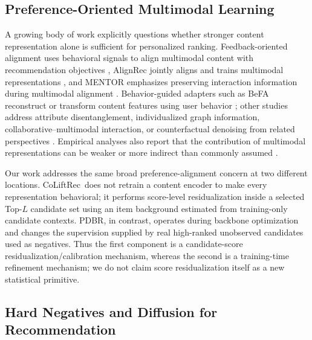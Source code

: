 \documentclass[sigconf,anonymous,review]{acmart}
\newcommand{\methodname}{CoLiftRec}
\newcommand{\pdbr}{PDBR}
\begin{document}
\subsection{Preference-Oriented Multimodal Learning}

A growing body of work explicitly questions whether stronger content representation alone is sufficient for personalized ranking.
Feedback-oriented alignment uses behavioral signals to align multimodal content with recommendation objectives \cite{xv2024damrs,li2024whotoalign}, AlignRec jointly aligns and trains multimodal representations \cite{liu2024alignrec}, and MENTOR emphasizes preserving interaction information during multimodal alignment \cite{xu2025mentor}.
Behavior-guided adapters such as BeFA reconstruct or transform content features using user behavior \cite{fan2025befa}; other studies address attribute disentanglement, individualized graph information, collaborative--multimodal interaction, or counterfactual denoising from related perspectives \cite{li2024attribute,yu2025pgl,xu2025stair,wen2025dance}.
Empirical analyses also report that the contribution of multimodal representations can be weaker or more indirect than commonly assumed \cite{pomo2025leverage}.

Our work addresses the same broad preference-alignment concern at two different locations.
\methodname\ does not retrain a content encoder to make every representation behavioral; it performs score-level residualization inside a selected Top-$L$ candidate set using an item background estimated from training-only candidate contexts.
\pdbr, in contrast, operates during backbone optimization and changes the supervision supplied by real high-ranked unobserved candidates used as negatives.
Thus the first component is a candidate-score residualization/calibration mechanism, whereas the second is a training-time refinement mechanism; we do not claim score residualization itself as a new statistical primitive.

\subsection{Hard Negatives and Diffusion for Recommendation}
\end{document}
